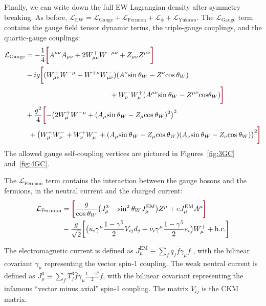 Finally, we can write down the full EW Lagrangian density after symmetry breaking. 
As before, $\mathcal{L}_\mathrm{EW} = \mathcal{L}_\mathrm{Gauge} + \mathcal{L}_\mathrm{Fermion} + \mathcal{L}_\mathrm{\phi} + \mathcal{L}_\mathrm{Yukawa}$. 
The $\mathcal{L}_\mathrm{Gauge}$ term contains the gauge field tensor dynamic terms, the triple-gauge couplings, and the quartic-gauge couplings:
\begin{equation} 
\begin{split}
\label{eq:L_Gauge}
\mathcal{L}_\mathrm{Gauge} & = -\frac{1}{4} \termLB A^{\mu\nu} A_{\mu\nu} + 2  W^+_{\mu\nu} W^{{-}\mu\nu} + Z_{\mu\nu} Z^{\mu\nu} \termRB  \\ 
 & - ig \termLB (W^+_{\mu\nu} W^{{-}\mu} - W^{+\mu} W^{{-}}_{\mu\nu})(A^\nu\mathrm{sin}\:\theta_W - Z^\nu \mathrm{cos}\:\theta_W)  \\
 & \qquad\qquad\qquad\qquad\qquad\qquad + W^{{-}}_{\nu} W^+_{\mu} (A^{\mu\nu} \mathrm{sin}\:\theta_W - Z^{\mu\nu} \mathrm{cos} \theta_W ) \termRB  \\
 & + \frac{g^2}{4} \termLB {-}\big( 2 W^+_\mu W^{{-}\mu} + (A_\mu \mathrm{sin}\:\theta_W - Z_\mu \mathrm{cos}\:\theta_W)^2 \big)^2 \\
 & \:\: + \big( W_\mu^+ W_\nu^{{-}} + W_\nu^+ W_\mu^{{-}} + (A_\mu \mathrm{sin}\:\theta_W - Z_\mu \mathrm{cos}\:\theta_W)(A_\nu\mathrm{sin}\:\theta_W - Z_\nu \mathrm{cos}\:\theta_W)\big)^2 \termRB
\end{split}
\end{equation}
The allowed gauge self-coupling vertices are pictured in Figures~\ref{fig:3GC} and~\ref{fig:4GC}.

The $\mathcal{L}_\mathrm{Fermion}$ term contains the interaction between the gauge bosons and the fermions, in the neutral current and the charged current:
\begin{equation}
\begin{split}
\label{eq:L_Fermion}
\mathcal{L}_\mathrm{Fermion} & = \termLB \frac{g}{\mathrm{cos}\:\theta_W} \big(J_\mu^\mathrm{3} - \mathrm{sin}^2\:\theta_W J_\mu^\mathrm{EM} \big) Z^\mu + eJ_\mu^\mathrm{EM} A^\mu \termRB \\
& - \frac{g}{\sqrt{2}} \termLB \big( \bar{u}_i \gamma^\mu \frac{1-\gamma^5}{2} V_{ij} d_j + \bar{\nu}_i \gamma^\mu \frac{1-\gamma^5}{2} e_i \big) W_\mu^+ + \mathrm{h.c.} \termRB
\end{split}
\end{equation}

The electromagnetic current is defined as $J^\mathrm{EM}_\mu \equiv \sum_f q_f \bar{f} \gamma_\mu f$ , with the bilinear covariant $\gamma_\mu$ representing the vector spin-1 coupling.
The weak neutral current is defined as $J^\mathrm{3}_\mu \equiv \sum_f T^3_f \bar{f} \gamma_\mu \frac{1-\gamma^5}{2} f$,
with the bilinear covariant representing the infamous ``vector minus axial'' spin-1 coupling.
The matrix $V_{ij}$ is the CKM matrix.

